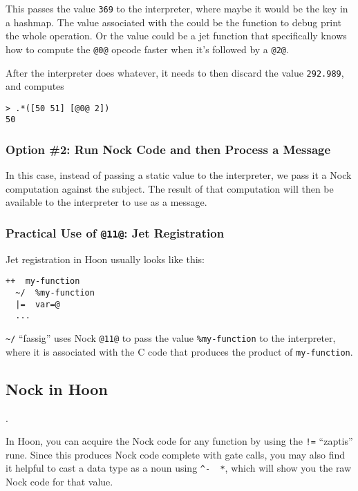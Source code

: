 \documentclass[twoside]{article}
\begin{document}
\noindent{}
This passes the value \lstinline[style=inlinecode]{369} to the interpreter, where maybe it would be the key in a hashmap. The value associated with the could be the function to debug print the whole operation. Or the value could be a jet function that specifically knows how to compute the \lstinline[style=inlinecode]{@0@} opcode faster when it's followed by a \lstinline[style=inlinecode]{@2@}.

After the interpreter does whatever, it needs to then discard the value \lstinline[style=inlinecode]{292.989}, and computes

\begin{lstlisting}[style=listingcode]
> .*([50 51] [@0@ 2])
50
\end{lstlisting}

\subsubsection{Option \#2: Run Nock Code and then Process a Message}

In this case, instead of passing a static value to the interpreter, we pass it a Nock computation against the subject. The result of that computation will then be available to the interpreter to use as a message.

\subsubsection{Practical Use of \lstinline[style=inlinecode]{@11@}: Jet Registration}

Jet registration in Hoon usually looks like this:

\begin{lstlisting}[style=listingcode]
++  my-function
  ~/  %my-function
  |=  var=@
  ...
\end{lstlisting}

\noindent
\lstinline[style=inlinecode]{~/} ``fassig'' uses Nock \lstinline[style=inlinecode]{@11@} to pass the value \lstinline[style=inlinecode]{%my-function} to the interpreter, where it is associated with the C code that produces the product of \lstinline[style=inlinecode]{my-function}.

\subsection{Nock in Hoon}.

In Hoon, you can acquire the Nock code for any function by using the \lstinline[style=inlinecode]{!=} ``zaptis'' rune.  Since this produces Nock code complete with gate calls, you may also find it helpful to cast a data type as a noun using \lstinline[style=inlinecode]{^-  *}, which will show you the raw Nock code for that value.
\end{document}
